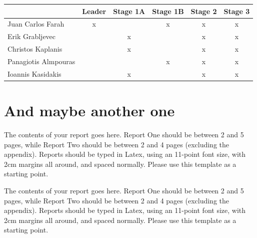 \documentclass[a4paper,11pt]{article}
\begin{document}
\begin{table}[ht]

\centering %

\begin{tabular}{l c c c c c} %


& Leader & Stage 1A & Stage 1B & Stage 2 & Stage 3\\ [0.5ex] %


\hline %

Juan Carlos Farah & x & & x & x & x \\ %

Erik Grabljevec & & x & & x & x \\

Christos Kaplanis & & x & & x & x \\

Panagiotis Almpouras & & & x & x & x \\

Ioannis Kasidakis & & x & & x & x \\ [1ex] %

\end{tabular}

\label{table:nonlin} %

\end{table}




\section{And maybe another one}

The contents of your report goes here.  Report One should be between 2
and 5 pages, while Report Two should be between 2 and 4 pages
(excluding the appendix).  Reports should be typed in Latex, using an
11-point font size, with 2cm margins all around, and spaced normally.
Please use this template as a starting point.

The contents of your report goes here.  Report One should be between 2
and 5 pages, while Report Two should be between 2 and 4 pages
(excluding the appendix).  Reports should be typed in Latex, using an
11-point font size, with 2cm margins all around, and spaced normally.
Please use this template as a starting point.
\end{document}
